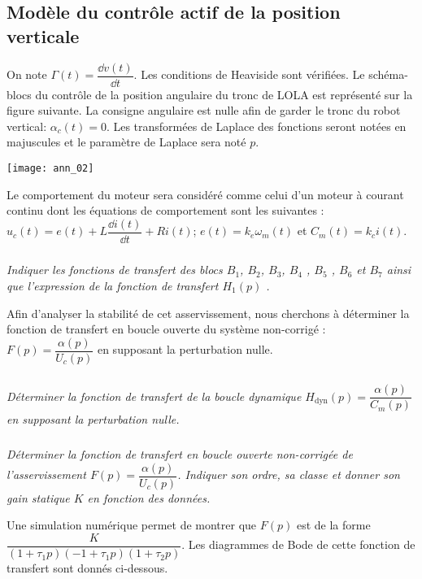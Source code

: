 \begin{multicols}{2}
\subsection*{Modèle du contrôle actif de la position verticale}

On note $\Gamma(t)=\dfrac{\dd v(t)}{\dd t }$. Les conditions de Heaviside sont vérifiées. Le schéma-blocs du contrôle de la position angulaire du tronc de LOLA est représenté sur la figure suivante. La consigne angulaire est nulle afin de garder le
tronc du robot vertical: $\alpha_c(t)=0$. Les transformées de Laplace des fonctions seront notées en majuscules et
le paramètre de Laplace sera noté $p$.

\begin{center}
\texttt{[image: ann\_02]}
\end{center}



Le comportement du moteur sera considéré comme celui d'un moteur à courant continu dont les équations de
comportement sont les suivantes : $u_c (t)=e(t)+L \dfrac{\dd i(t)}{\dd t} +Ri (t)$; $e(t)=k_e\omega_m(t)$ et $C_m( t)=k_c i(t)$.


\subparagraph{} \textit{Indiquer les fonctions de transfert des blocs $B_1$, $B_2$, $B_3$, $B_4$ , $B_5$ , $B_6$ et $B_7$ ainsi que l'expression de la fonction de transfert $H_1(p)$ .}
\ifprof
\begin{corrige}
\end{corrige}
\else
\fi

Afin d'analyser la stabilité de cet asservissement, nous cherchons à déterminer la fonction de transfert en
boucle ouverte du système non-corrigé : $ F(p)= \dfrac{\alpha (p)}{U_c (p)}$ en supposant la perturbation nulle.

\subparagraph{} \textit{Déterminer la fonction de transfert de la boucle dynamique $H_{\text{dyn}}(p)=\dfrac{\alpha (p)}{C_m(p)}$ en supposant la perturbation nulle.}
\ifprof
\begin{corrige}
\end{corrige}
\else
\fi


\subparagraph{} \textit{Déterminer la fonction de transfert en boucle ouverte non-corrigée de l'asservissement $ F(p)= \dfrac{\alpha (p)}{U_c (p)}$.
Indiquer son ordre, sa classe et donner son gain statique $K$ en fonction des données.}
\ifprof
\begin{corrige}
\end{corrige}
\else
\fi

Une simulation numérique permet de montrer que $F(p)$ est de la forme $\dfrac{K}{(1+ \tau_1p)(-1+ \tau_1p)(1+ \tau_2p)}$. Les diagrammes de Bode de cette fonction de transfert sont donnés ci-dessous.


\end{multicols}
